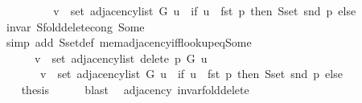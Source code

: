 \begin{isabellebody}
\ \ \ \ \isamarkupfalse%
\ \isamarkupfalse%
\ {\isachardoublequoteopen}{\isachardot}{\kern0pt}{\isachardot}{\kern0pt}{\isachardot}{\kern0pt}\ {\isasymlongleftrightarrow}\ v\ {\isasymin}\ set\ {\isacharparenleft}{\kern0pt}adjacency{\isacharunderscore}{\kern0pt}list\ G\ u{\isacharparenright}{\kern0pt}\ {\isacharminus}{\kern0pt}\ {\isacharparenleft}{\kern0pt}if\ u\ {\isacharequal}{\kern0pt}\ fst\ p\ then\ S{\isachardot}{\kern0pt}set\ {\isacharparenleft}{\kern0pt}snd\ p{\isacharparenright}{\kern0pt}\ else\ {\isacharbraceleft}{\kern0pt}{\isacharbraceright}{\kern0pt}{\isacharparenright}{\kern0pt}{\isachardoublequoteclose}\isanewline
\ \ \ \ \ \ \isamarkupfalse%
\ invar\ S{\isachardot}{\kern0pt}fold{\isacharunderscore}{\kern0pt}delete{\isacharunderscore}{\kern0pt}cong\ Some\isanewline
\ \ \ \ \ \ \isamarkupfalse%
\ {\isacharparenleft}{\kern0pt}simp\ add{\isacharcolon}{\kern0pt}\ S{\isachardot}{\kern0pt}set{\isacharunderscore}{\kern0pt}def\ mem{\isacharunderscore}{\kern0pt}adjacency{\isacharunderscore}{\kern0pt}iff{\isacharunderscore}{\kern0pt}lookup{\isacharunderscore}{\kern0pt}eq{\isacharunderscore}{\kern0pt}Some{\isacharparenright}{\kern0pt}\isanewline
\ \ \ \ \isamarkupfalse%
\ \isamarkupfalse%
\isanewline
\ \ \ \ \ \ {\isachardoublequoteopen}v\ {\isasymin}\ set\ {\isacharparenleft}{\kern0pt}adjacency{\isacharunderscore}{\kern0pt}list\ {\isacharparenleft}{\kern0pt}delete{\isacharunderscore}{\kern0pt}{}\ p\ G{\isacharparenright}{\kern0pt}\ u{\isacharparenright}{\kern0pt}\ {\isasymlongleftrightarrow}\isanewline
\ \ \ \ \ \ \ v\ {\isasymin}\ set\ {\isacharparenleft}{\kern0pt}adjacency{\isacharunderscore}{\kern0pt}list\ G\ u{\isacharparenright}{\kern0pt}\ {\isacharminus}{\kern0pt}\ {\isacharparenleft}{\kern0pt}if\ u\ {\isacharequal}{\kern0pt}\ fst\ p\ then\ S{\isachardot}{\kern0pt}set\ {\isacharparenleft}{\kern0pt}snd\ p{\isacharparenright}{\kern0pt}\ else\ {\isacharbraceleft}{\kern0pt}{\isacharbraceright}{\kern0pt}{\isacharparenright}{\kern0pt}{\isachardoublequoteclose}\isanewline
\ \ \ \ \ \ \isacommand{{\isachardot}{\kern0pt}}\isamarkupfalse%
\ \isacommand{{\isacharbraceright}{\kern0pt}}\isamarkupfalse%
\isanewline
\ \ \isamarkupfalse%
\ {\isacharquery}{\kern0pt}thesis\isanewline
\ \ \ \ \isamarkupfalse%
\ blast\isanewline
{}\isamarkupfalse%
%
\endisatagproof
{\isafoldproof}%
%
\isadelimproof
\isanewline
%
\endisadelimproof
\isanewline
{}\isamarkupfalse%
\ {\isacharparenleft}{\kern0pt}\ adjacency{\isacharparenright}{\kern0pt}\ invar{\isacharunderscore}{\kern0pt}fold{\isacharunderscore}{\kern0pt}delete{\isacharunderscore}{\kern0pt}{}{\isacharcolon}{\kern0pt}\isanewline

\end{isabellebody}
